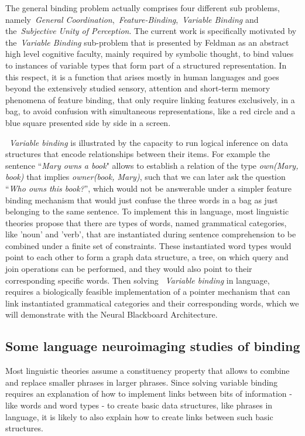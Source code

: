 \documentclass[10pt]{article}
\begin{document}
The general binding problem actually comprises four different sub problems, namely~\emph{General Coordination},~\emph{Feature-Binding},~\emph{Variable Binding} and the~\emph{Subjective Unity of Perception}\cite{Feldman_2012}.
The current work is specifically motivated by the~\emph{Variable Binding} sub-problem that is presented by Feldman as an abstract high level cognitive faculty, mainly required by symbolic thought, to bind values to instances of variable types that form part of a structured representation.
In this respect, it is a function that arises mostly in human languages and goes beyond the extensively studied sensory, attention and short-term memory phenomena of feature binding, that only require linking features exclusively, in a bag, to avoid confusion with simultaneous representations, like a red circle and a blue square presented side by side in a screen.

~\emph{Variable binding} is illustrated by the capacity to run logical inference on data structures that encode relationships between their items.
For example the sentence ``\emph{Mary owns a book}" allows to establish a relation of the type \emph{own(Mary, book)} that implies \emph{owner(book, Mary)}, such that we can later ask the question ``\emph{Who owns this book?}'', which would not be answerable under a simpler feature binding mechanism that would just confuse the three words in a bag as just belonging to the same sentence.
To implement this in language, most linguistic theories propose that there are types of words, named grammatical categories, like 'noun' and 'verb', that are instantiated during sentence comprehension to be combined under a finite set of constraints.
These instantiated word types would point to each other to form a graph data structure, a tree, on which query and join operations can be performed, and they would also point to their corresponding specific words.
Then solving ~\emph{Variable binding} in language, requires a biologically feasible implementation of a pointer mechanism that can link instantiated grammatical categories and their corresponding words, which we will demonstrate with the Neural Blackboard Architecture.


\subsection{Some language neuroimaging studies of binding}
{\label{intro:imaging}}

Most linguistic theories assume a constituency property that allows to combine and replace smaller phrases in larger phrases.
Since solving variable binding requires an explanation of how to implement links between bits of information - like words and word types - to create basic data structures, like phrases in language, it is likely to also explain how to create links between such basic structures.
\end{document}
